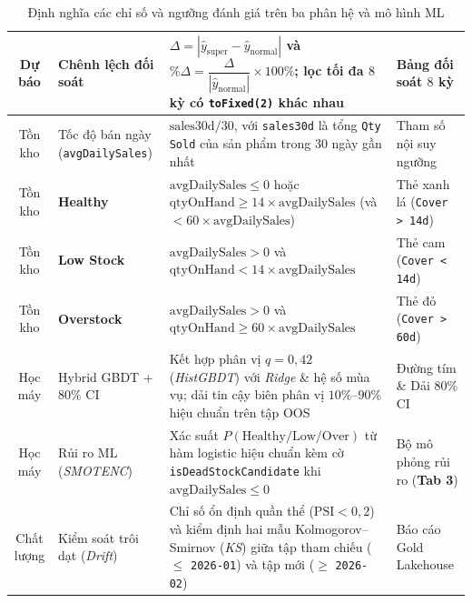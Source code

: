 \begin{table}[H]
\begin{tabular}{c p{2.5cm} p{8cm} p{3.3cm}}
		Dự báo           & Chênh lệch đối soát                                & $\Delta = |\hat{y}_{\text{super}} - \hat{y}_{\text{normal}}|$ và $\%\Delta = \dfrac{\Delta}{|\hat{y}_{\text{normal}}|} \times 100\%$; lọc tối đa $8$ kỳ có \texttt{toFixed(2)} khác nhau & Bảng đối soát $8$ kỳ                         \\
		\midrule
		Tồn kho          & Tốc độ bán ngày (\texttt{avgDailySales}) & $\text{sales30d} / 30$, với \texttt{sales30d} là tổng \texttt{Qty Sold} của sản phẩm trong $30$ ngày gần nhất                                                                        & Tham số nội suy ngưỡng                       \\
		Tồn kho          & \textbf{Healthy}                                   & $\text{avgDailySales} \le 0$ hoặc $\text{qtyOnHand} \ge 14 \times \text{avgDailySales}$ (và $< 60 \times \text{avgDailySales}$)                                                                          & Thẻ xanh lá (\texttt{Cover > 14d}) \\
		Tồn kho          & \textbf{Low Stock}                                 & $\text{avgDailySales} > 0$ và $\text{qtyOnHand} < 14 \times \text{avgDailySales}$                                                                                                                        & Thẻ cam (\texttt{Cover < 14d})     \\
		Tồn kho          & \textbf{Overstock}                                 & $\text{avgDailySales} > 0$ và $\text{qtyOnHand} \ge 60 \times \text{avgDailySales}$                                                                                                                      & Thẻ đỏ (\texttt{Cover > 60d})      \\
		\midrule
		Học máy          & Hybrid GBDT + $80\%$ CI                            & Kết hợp phân vị $q=0{,}42$ (\textit{HistGBDT}) với \textit{Ridge} \& hệ số mùa vụ; dải tin cậy biên phân vị $10\%$--$90\%$ hiệu chuẩn trên tập OOS                                                       & Đường tím \& Dải $80\%$ CI                   \\
		Học máy          & Rủi ro ML (\textit{SMOTENC})                       & Xác suất $P(\text{Healthy/Low/Over})$ từ hàm logistic hiệu chuẩn kèm cờ \texttt{isDeadStockCandidate} khi $\text{avgDailySales} \le 0$                                                         & Bộ mô phỏng rủi ro (\textbf{Tab 3})          \\
		Chất lượng       & Kiểm soát trôi dạt (\textit{Drift})                & Chỉ số ổn định quần thể ($\text{PSI} < 0{,}2$) và kiểm định hai mẫu Kolmogorov--Smirnov (\textit{KS}) giữa tập tham chiếu ($\le$ \texttt{2026-01}) và tập mới ($\ge$ \texttt{2026-02})                   & Báo cáo Gold Lakehouse                       \\
		\bottomrule
	\end{tabular}
	\caption{Định nghĩa các chỉ số và ngưỡng đánh giá trên ba phân hệ và mô hình ML}
	\label{tab:kpi-definitions}
\end{table}

